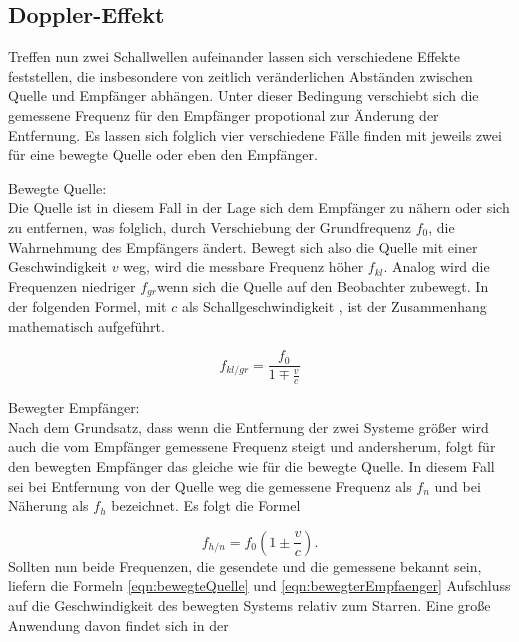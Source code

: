 \subsection{Doppler-Effekt}
Treffen nun zwei Schallwellen aufeinander lassen sich verschiedene Effekte feststellen, die insbesondere von zeitlich veränderlichen
Abständen zwischen Quelle und Empfänger abhängen. Unter dieser Bedingung verschiebt sich die gemessene Frequenz für den Empfänger 
propotional zur Änderung der Entfernung. 
Es lassen sich folglich vier verschiedene Fälle finden mit jeweils zwei für eine bewegte Quelle oder eben den Empfänger.
\begin{description}
    \item Bewegte Quelle: \\
    Die Quelle ist in diesem Fall in der Lage sich dem Empfänger zu nähern oder sich zu entfernen, was folglich, durch Verschiebung der Grundfrequenz $f_0$,
    die Wahrnehmung des Empfängers ändert. Bewegt sich also die Quelle mit einer Geschwindigkeit $v$ weg, wird die messbare Frequenz höher $f_{kl}$. Analog wird die Frequenzen
    niedriger $f_{gr}$wenn sich die Quelle auf den Beobachter zubewegt. In der folgenden Formel, mit $c$ als Schallgeschwindigkeit
    \cite{skript}, ist der Zusammenhang mathematisch aufgeführt.
\end{description}
\begin{equation}
    \label{eqn:bewegteQuelle}
    f_{kl/gr} = \frac{f_0}{1 \mp \frac{v}{c}}
\end{equation}
\begin{description}
    \item Bewegter Empfänger: \\
    Nach dem Grundsatz, dass wenn die Entfernung der zwei Systeme größer wird auch die vom Empfänger gemessene Frequenz steigt und andersherum,
    folgt für den bewegten Empfänger das gleiche wie für die bewegte Quelle. In diesem Fall sei bei Entfernung von der Quelle weg die gemessene 
    Frequenz als $f_n$ und bei Näherung als $f_h$ bezeichnet. Es folgt die Formel
\end{description}
\begin{equation}
    \label{eqn:bewegterEmpfaenger}
    f_{h/n} = f_0 \left ( 1 \pm \frac{v}{c} \right ).
\end{equation}
Sollten nun beide Frequenzen, die gesendete und die gemessene bekannt sein, liefern die Formeln \eqref{eqn:bewegteQuelle} und \eqref{eqn:bewegterEmpfaenger}
Aufschluss auf die Geschwindigkeit des bewegten Systems relativ zum Starren. Eine große Anwendung davon findet sich in der 

